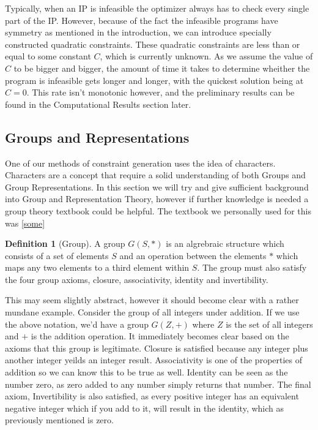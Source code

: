 \documentclass[11pt]{article} %
\theoremstyle{definition}
\newtheorem{definition}[theorem]{Definition}
\theoremstyle{remark}
\begin{document}
Typically, when an IP is infeasible the optimizer always has to check every single part of the IP. However, because of the fact the infeasible programs have symmetry as mentioned in the introduction, we can introduce specially constructed quadratic constraints. These quadratic constraints are less than or equal to some constant $C$, which is currently unknown. As we assume the value of $C$ to be bigger and bigger, the amount of time it takes to determine wheither the program is infeasible gets longer and longer, with the quickest solution being at $C = 0$. This rate isn't monotonic however, and the preliminary results can be found in the Computational Results section later.

\subsection{Groups and Representations}
One of our methods of constraint generation uses the idea of characters. Characters are a concept that require a solid understanding of both Groups and Group Representations. In this section we will try and give sufficient background into Group and Representation Theory, however if further knowledge is needed a group theory textbook could be helpful. The textbook we personally used for this was \ref{some}

\begin{definition} [Group]
A group $G(S,*)$ is an algrebraic structure which consists of a set of elements $S$ and an operation between the elements $*$ which maps any two elements to a third element within $S$. The group must also satisfy the four group axioms, closure, associativity, identity and invertibility.
\end{definition}

This may seem slightly abstract, however it should become clear with a rather mundane example. Consider the group of all integers under addition. If we use the above notation, we'd have a group $G(Z, +)$ where $Z$ is the set of all integers and $+$ is the addition operation. It immediately becomes clear based on the axioms that this group is legitimate. Closure is satisfied because any integer plus another integer yeilds an integer result. Associativity is one of the properties of addition so we can know this to be true as well. Identity can be seen as the number zero, as zero added to any number simply returns that number. The final axiom, Invertibility is also satisfied, as every positive integer has an equivalent negative integer which if you add to it, will result in the identity, which as previously mentioned is zero.
\end{document}
